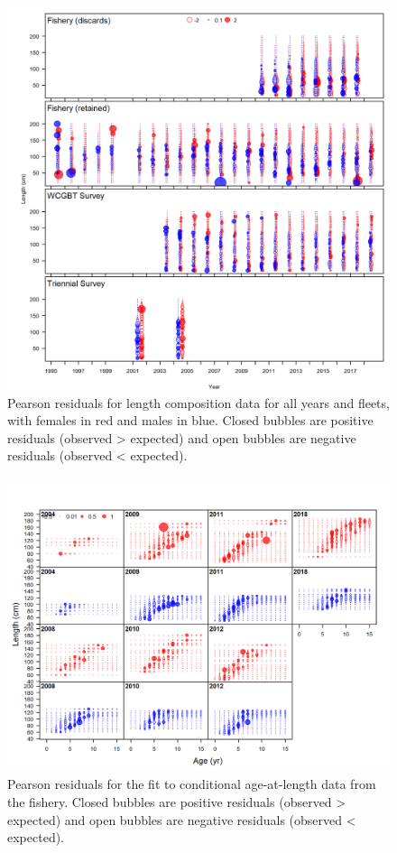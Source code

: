\documentclass[12pt,]{article}
\begin{document}
\begin{figure}
\centering
\includegraphics{r4ss/plots_mod1/comp_lenfit__multi-fleet_comparison.png}
\caption{Pearson residuals for length composition data for all years and
fleets, with females in red and males in blue. Closed bubbles are
positive residuals (observed \textgreater{} expected) and open bubbles
are negative residuals (observed \textless{} expected).
\label{fig:comp_lenfit__multi-fleet_comparison}}
\end{figure}

\begin{figure}
\centering
\includegraphics{r4ss/plots_mod1/comp_condAALfit_residsflt1mkt2.png}
\caption{Pearson residuals for the fit to conditional age-at-length data
from the fishery. Closed bubbles are positive residuals (observed
\textgreater{} expected) and open bubbles are negative residuals
(observed \textless{} expected). \label{fig:age_fit_fishery}}
\end{figure}
\end{document}
